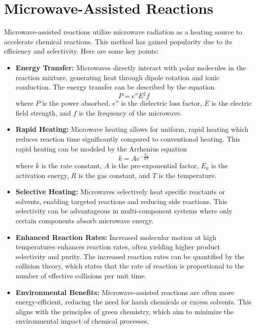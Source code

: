 \documentclass[11pt]{article}
\begin{document}
\tableofcontents
\thispagestyle{empty}
\clearpage

\setcounter{page}{1}
\section{Microwave-Assisted Reactions}
Microwave-assisted reactions utilize microwave radiation as a heating source to accelerate chemical reactions. This method has gained popularity due to its efficiency and selectivity. Here are some key points:

\begin{itemize}
    \item \textbf{Energy Transfer:} Microwaves directly interact with polar molecules in the reaction mixture, generating heat through dipole rotation and ionic conduction. The energy transfer can be described by the equation 
    \[
    P = \epsilon'' E^2 f
    \]
    where \( P \) is the power absorbed, \( \epsilon'' \) is the dielectric loss factor, \( E \) is the electric field strength, and \( f \) is the frequency of the microwave.
    \item \textbf{Rapid Heating:} Microwave heating allows for uniform, rapid heating which reduces reaction time significantly compared to conventional heating. This rapid heating can be modeled by the Arrhenius equation 
    \[
    k = A e^{-\frac{E_a}{RT}}
    \]
    where \( k \) is the rate constant, \( A \) is the pre-exponential factor, \( E_a \) is the activation energy, \( R \) is the gas constant, and \( T \) is the temperature.
    \item \textbf{Selective Heating:} Microwaves selectively heat specific reactants or solvents, enabling targeted reactions and reducing side reactions. This selectivity can be advantageous in multi-component systems where only certain components absorb microwave energy.
    \item \textbf{Enhanced Reaction Rates:} Increased molecular motion at high temperatures enhances reaction rates, often yielding higher product selectivity and purity. The increased reaction rates can be quantified by the collision theory, which states that the rate of reaction is proportional to the number of effective collisions per unit time.
    \item \textbf{Environmental Benefits:} Microwave-assisted reactions are often more energy-efficient, reducing the need for harsh chemicals or excess solvents. This aligns with the principles of green chemistry, which aim to minimize the environmental impact of chemical processes.
\end{itemize}
\end{document}
